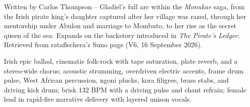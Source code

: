
\label{sec:throne-of-smoke}
\begin{notes}
Written by Carlos Thompson -- Gladiel's full arc within the \emph{Monukae} saga, from the Irish pirate king's daughter captured after her village was razed, through her mentorship under Abulon and marriage to Mombuto, to her rise as the secret queen of the sea. Expands on the backstory introduced in \emph{The Pirate's Ledger}. Retrieved from rataflechera's Suno page (V6, 16 September 2026).
\end{notes}
\begin{style}
Irish epic ballad, cinematic folk-rock with tape saturation, plate reverb, and a stereo-wide chorus; acoustic strumming, overdriven electric accents, frame drum pulse, West African percussion, ngoni plucks, kora filigree, brass stabs, and driving kick drum; brisk 132 BPM with a driving pulse and chant refrain; female lead in rapid-fire narrative delivery with layered unison vocals.
\end{style}
